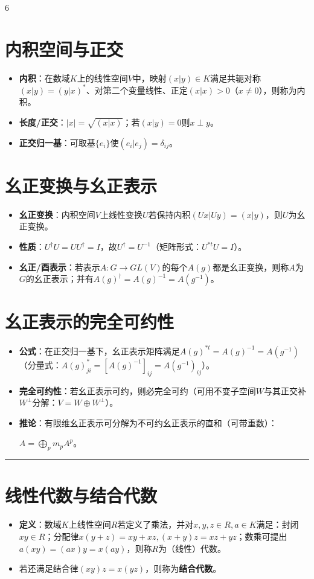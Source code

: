 \documentclass[landscape]{article}
\begin{document}
\begin{multicols*}{6}
\section*{内积空间与正交}
\begin{itemize}
  \item \textbf{内积}：在数域$K$上的线性空间$V$中，映射$(x|y)\in K$满足共轭对称$( x|y)=( y|x)^{*}$、对第二个变量线性、正定$( x|x)>0$（$x\neq0$），则称为内积。
  \item \textbf{长度/正交}：$|x|=\sqrt{( x|x)}$；若$( x|y)=0$则$x\perp y$。
  \item \textbf{正交归一基}：可取基$\{e_i\}$使$( e_i|e_j)=\delta_{ij}$。
\end{itemize}

\section*{幺正变换与幺正表示}
\begin{itemize}
  \item \textbf{幺正变换}：内积空间$V$上线性变换$U$若保持内积$(Ux|Uy)=(x|y)$，则$U$为幺正变换。
  \item \textbf{性质}：$U^{\dagger}U=UU^{\dagger}=I$，故$U^{\dagger}=U^{-1}$（矩阵形式：$U^{*t}U=I$）。
  \item \textbf{幺正/酉表示}：若表示$A:G\to GL(V)$的每个$A(g)$都是幺正变换，则称$A$为$G$的幺正表示；并有$A(g)^{\dagger}=A(g)^{-1}=A(g^{-1})$。
\end{itemize}

\section*{幺正表示的完全可约性}
\begin{itemize}
  \item \textbf{公式}：在正交归一基下，幺正表示矩阵满足$A(g)^{*t}=A(g)^{-1}=A(g^{-1})$（分量式：$A(g)_{ji}^{*}=[A(g)^{-1}]_{ij}=A(g^{-1})_{ij}$）。
  \item \textbf{完全可约性}：若幺正表示可约，则必完全可约（可用不变子空间$W$与其正交补$W^{\perp}$分解：$V=W\oplus W^{\perp}$）。
  \item \textbf{推论}：有限维幺正表示可分解为不可约幺正表示的直和（可带重数）：
  
  $A=\bigoplus_{p} m_p A^{p}$。
\end{itemize}
\noindent\textcolor{red}{\rule{\linewidth}{1pt}}
\section*{线性代数与结合代数}
\begin{itemize}
  \item \textbf{定义}：数域$K$上线性空间$R$若定义了乘法，并对$x,y,z\in R,a\in K$满足：封闭$xy\in R$；分配律$x(y+z)=xy+xz,(x+y)z=xz+yz$；数乘可提出$a(xy)=(ax)y=x(ay)$，则称$R$为（线性）代数。
  \item 若还满足结合律$(xy)z=x(yz)$，则称为\textbf{结合代数}。
\end{itemize}


\end{multicols*}
\end{document}

